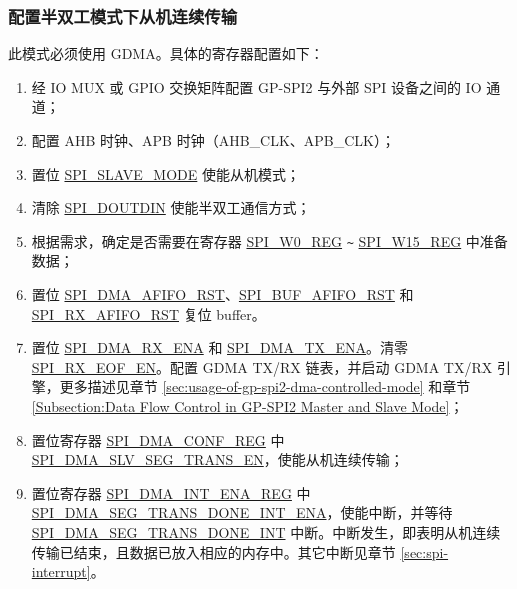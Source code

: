 \documentclass[main\_\_CN.tex]{subfiles}
\begin{document}
\subsubsection{配置半双工模式下从机连续传输}\label{sec:gp-spi2-slave-hd-seg-trans}

此模式必须使用 GDMA。具体的寄存器配置如下：

\begin{enumerate}
   \item 经 IO MUX 或 GPIO 交换矩阵配置 GP-SPI2 与外部 SPI 设备之间的 IO 通道；

   \item 配置 AHB 时钟、APB 时钟（AHB\_CLK、APB\_CLK）；

    \item 置位 \hyperref[fielddesc:SPISLAVEMODE]{SPI\_SLAVE\_MODE} 使能从机模式；

    \item 清除 \hyperref[fielddesc:SPIDOUTDIN]{SPI\_DOUTDIN} 使能半双工通信方式；

    \item 根据需求，确定是否需要在寄存器 \hyperref[regdesc:SPIW0REG]{SPI\_W0\_REG} \verb+~+ \hyperref[regdesc:SPIW15REG]{SPI\_W15\_REG} 中准备数据；

    \item 置位 \hyperref[fielddesc:SPIDMAAFIFORST]{SPI\_DMA\_AFIFO\_RST}、\hyperref[fielddesc:SPIBUFAFIFORST]{SPI\_BUF\_AFIFO\_RST} 和 \hyperref[fielddesc:SPIRXAFIFORST]{SPI\_RX\_AFIFO\_RST} 复位 buffer。

    \item 置位 \hyperref[fielddesc:SPIDMARXENA]{SPI\_DMA\_RX\_ENA} 和 \hyperref[fielddesc:SPIDMATXENA]{SPI\_DMA\_TX\_ENA}。清零 \hyperref[fielddesc:SPIRXEOFEN]{SPI\_RX\_EOF\_EN}。配置 GDMA TX/RX 链表，并启动 GDMA TX/RX 引擎，更多描述见章节 \ref{sec:usage-of-gp-spi2-dma-controlled-mode} 和章节 \ref{Subsection:Data Flow Control in GP-SPI2 Master and Slave Mode}；

    \item 置位寄存器 \hyperref[regdesc:SPIDMACONFREG]{SPI\_DMA\_CONF\_REG} 中 \hyperref[fielddesc:SPIDMASLVSEGTRANSEN]{SPI\_DMA\_SLV\_SEG\_TRANS\_EN}，使能从机连续传输；

    \item 置位寄存器 \hyperref[regdesc:SPIDMAINTENAREG]{SPI\_DMA\_INT\_ENA\_REG} 中 \hyperref[fielddesc:SPIDMASEGTRANSDONEINTENA]{SPI\_DMA\_SEG\_TRANS\_DONE\_INT\_ENA}，使能中断，并等待 \hyperref[int:SPIDMASEGTRANSDONEINT]{SPI\_DMA\_SEG\_TRANS\_DONE\_INT} 中断。中断发生，即表明从机连续传输已结束，且数据已放入相应的内存中。其它中断见章节 \ref{sec:spi-interrupt}。
\end{enumerate}
\end{document}
